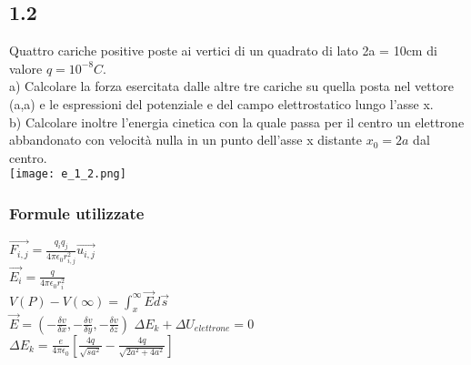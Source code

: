 \documentclass[../../main.tex]{subfiles}
\begin{document}
\subsection*{1.2}
Quattro cariche positive poste ai vertici di un quadrato di lato 2a = 10cm di valore $q = 10^{-8}C$.
\\a) Calcolare la forza esercitata dalle altre tre cariche su quella posta nel vettore (a,a) e le espressioni del potenziale e del campo elettrostatico lungo l'asse x.
\\b) Calcolare inoltre l'energia cinetica con la quale passa per il centro un elettrone abbandonato con velocità nulla in un punto dell'asse x distante $x_0 = 2a$ dal centro. 
\\\texttt{[image: e\_1\_2.png]}
\subsubsection*{Formule utilizzate}
$\vec{F_{i,j}} = \frac{q_iq_j}{4\pi\epsilon_0r_{i,j}^2}\vec{u_{i,j}}$
\\$\vec{E_i} = \frac{q}{4\pi\epsilon_0r_i^2}$
\\$V(P) - V(\infty) = \int_x^\infty \vec{E}d\vec{s}$
\\$\vec{E} = \left(-\frac{\delta v}{\delta x}, -\frac{\delta v}{\delta y},-\frac{\delta v}{\delta z}\right)$
$\Delta E_k + \Delta U_{elettrone} = 0 $
\\$\Delta E_k = \frac{e}{4\pi\epsilon_0}\left[\frac{4q}{\sqrt{sa^2}}- \frac{4q}{\sqrt{2a^2 + 4a^2}}\right]$
\end{document}
